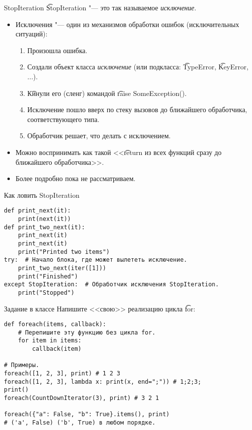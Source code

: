 \begin{frame}{StopIteration}
	\t{StopIteration} "--- это так называемое \textit{исключение}.

	\begin{itemize}
		\item Исключения "--- один из механизмов обработки ошибок (исключительных ситуаций):
			\begin{enumerate}
				\item Произошла ошибка.
				\item Создали объект класса \textit{исключение} (или подкласса: \t{TypeError}, \t{KeyError}, ...).
				\item \t{Кинули} его (сленг) командой \t{raise SomeException()}.
				\item Исключение пошло вверх по стеку вызовов до ближайшего обработчика, соответствующего типа.
				\item Обработчик решает, что делать с исключением.
			\end{enumerate}
		\item Можно воспринимать как такой <<\t{return} из всех функций сразу до ближайшего обработчика>>.
		\item Более подробно пока не рассматриваем.
	\end{itemize}
\end{frame}

\begin{frame}[fragile]{Как ловить StopIteration}
\begin{verbatim}
def print_next(it):
    print(next(it))
def print_two_next(it):
    print_next(it)
    print_next(it)
    print("Printed two items")
try:  # Начало блока, где может вылететь исключение.
    print_two_next(iter([1]))
    print("Finished")
except StopIteration:  # Обработчик исключения StopIteration.
    print("Stopped")
\end{verbatim}
\end{frame}

\begin{frame}[fragile]{Задание в классе}
	Напишите <<свою>> реализацию цикла \t{for}:
\begin{verbatim}
def foreach(items, callback):
    # Перепишите эту функцию без цикла for.
    for item in items:
        callback(item)

# Примеры.
foreach([1, 2, 3], print) # 1 2 3
foreach([1, 2, 3], lambda x: print(x, end=";")) # 1;2;3;
print()
foreach(CountDownIterator(3), print) # 3 2 1

foreach({"a": False, "b": True}.items(), print)
# ('a', False) ('b', True) в любом порядке.
\end{verbatim}
\end{frame}
